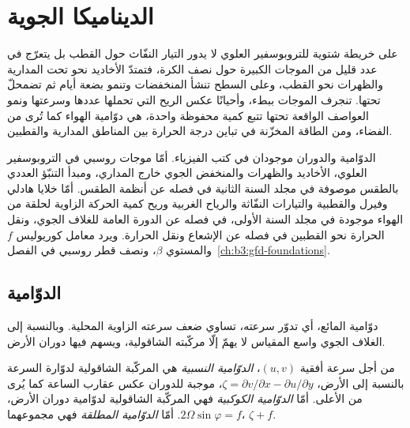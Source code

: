 \chapter{الديناميكا الجوية}\label{ch:b3:atmospheric-dynamics}

على خريطة شتوية للتروبوسفير العلوي لا يدور التيار النفّاث حول القطب
بل يتعرّج في عدد قليل من الموجات الكبيرة حول نصف الكرة،
فتمتدّ الأخاديد نحو تحت المدارية والظهرات نحو
القطب، وعلى السطح تنشأ المنخفضات وتنمو بضعة أيام ثم تضمحلّ
تحتها. تنجرف الموجات ببطء، وأحيانًا عكس الريح التي تحملها
عددها وسرعتها ونمو العواصف الواقعة تحتها تتبع كمية محفوظة واحدة،
هي دوّامية الهواء كما تُرى من
الفضاء، ومن الطاقة المخزّنة في تباين درجة الحرارة بين
المناطق المدارية والقطبين.

\begin{recall}
الدوّامية والدوران موجودان في كتب الفيزياء. أمّا موجات روسبي في التروبوسفير العلوي،
الأخاديد والظهرات والمنخفض الجوي خارج المداري،
ومبدأ التنبّؤ العددي بالطقس موصوفة في مجلد السنة الثانية
في فصله عن أنظمة الطقس. أمّا خلايا هادلي وفيرل والقطبية
والتيارات النفّاثة والرياح الغربية وريح كمية الحركة الزاوية لحلقة من
الهواء موجودة في مجلد السنة الأولى، في فصله عن الدورة العامة للغلاف
الجوي، ونقل الحرارة نحو القطبين في فصله عن
الإشعاع ونقل الحرارة. ويرد معامل كوريوليس $f$ والمستوي $\beta$،
ونصف قطر روسبي  في
الفصل~\ref{ch:b3:gfd-foundations}.
\end{recall}

\section{الدوّامية}\label{sec:b3:atmospheric-dynamics:vorticity}

دوّامية المائع، أي تدوّر سرعته، تساوي ضعف سرعته الزاوية
المحلية. وبالنسبة إلى الغلاف الجوي واسع المقياس لا يهمّ إلّا مركّبته الشاقولية،
ويسهم فيها دوران الأرض.

\begin{definition}\label{def:b3:atmospheric-dynamics:vorticity-kinds}
من أجل سرعة أفقية $(u, v)$، \emph{الدوّامية
النسبية} هي المركّبة الشاقولية لدوّارة
السرعة بالنسبة إلى الأرض، $\zeta = \partial v/\partial x -
\partial u/\partial y$، موجبة للدوران عكس عقارب الساعة كما يُرى من الأعلى.
أمّا \emph{الدوّامية الكوكبية} فهي المركّبة الشاقولية
لدوّامية دوران الأرض، $2\Omega\sin\varphi =
f$. أمّا \emph{الدوّامية المطلقة} فهي مجموعهما،
$\zeta + f$.
\end{definition}

